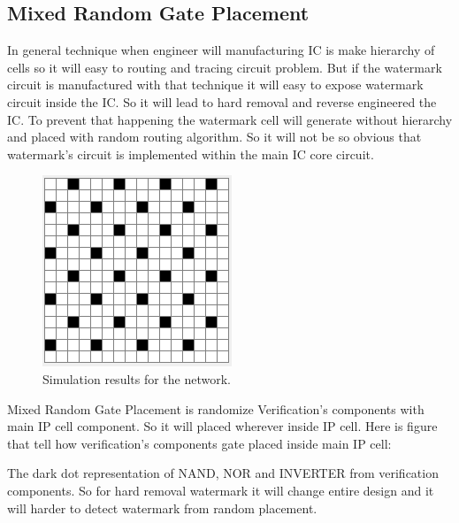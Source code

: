 \documentclass[10pt,journal,compsoc]{IEEEtran}
\begin{document}
\subsection{Mixed Random Gate Placement}
In general technique when engineer will manufacturing IC is make hierarchy of cells so it will easy to routing and tracing circuit problem. But if the watermark circuit is manufactured with that technique it will easy to expose watermark circuit inside the IC. So it will lead to hard removal and reverse engineered the IC. To prevent that happening the watermark cell will generate without hierarchy and placed with random routing algorithm. So it will not be so obvious that watermark’s circuit is implemented within the main IC core circuit.
\begin{figure}[h]
	\centering
	\includegraphics[scale=1.0]{gatePlace}
	\caption{Simulation results for the network.}
	\label{fig_sim}
\end{figure}
Mixed Random Gate Placement is randomize Verification’s components with main IP cell component. So it will placed wherever inside IP cell. Here is figure that tell how verification’s components gate placed inside main IP cell:



The dark dot representation of NAND, NOR and INVERTER from verification components. So for hard removal watermark it will change entire design and it will harder to detect watermark from random placement.
\end{document}
